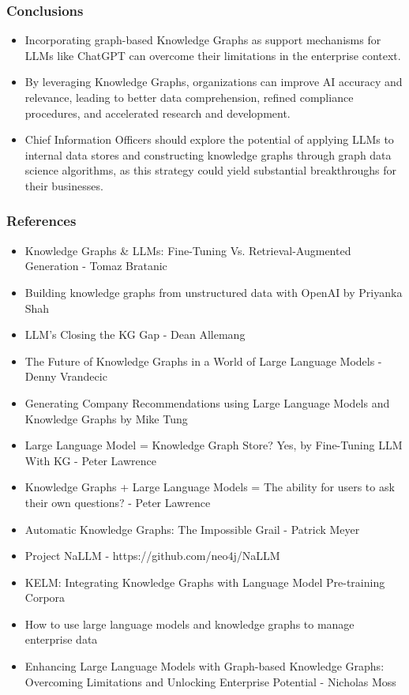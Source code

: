 \begin{frame}[fragile]\frametitle{Conclusions}
\begin{itemize}
\item Incorporating graph-based Knowledge Graphs as support mechanisms for LLMs like ChatGPT can overcome their limitations in the enterprise context. 
\item By leveraging Knowledge Graphs, organizations can improve AI accuracy and relevance, leading to better data comprehension, refined compliance procedures, and accelerated research and development. 
\item Chief Information Officers should explore the potential of applying LLMs to internal data stores and constructing knowledge graphs through graph data science algorithms, as this strategy could yield substantial breakthroughs for their businesses.
\end{itemize}
\end{frame}


\begin{frame}[fragile]\frametitle{References}
\begin{itemize}
\item Knowledge Graphs \& LLMs: Fine-Tuning Vs. Retrieval-Augmented Generation - Tomaz Bratanic
\item Building knowledge graphs from unstructured data with OpenAI by Priyanka Shah
\item LLM’s Closing the KG Gap - Dean Allemang
\item The Future of Knowledge Graphs in a World of Large Language Models - Denny Vrandecic
\item Generating Company Recommendations using Large Language Models and Knowledge Graphs by Mike Tung
\item Large Language Model = Knowledge Graph Store? Yes, by Fine-Tuning LLM With KG - Peter Lawrence
\item Knowledge Graphs + Large Language Models = The ability for users to ask their own questions? - Peter Lawrence
\item Automatic Knowledge Graphs: The Impossible Grail - Patrick Meyer
\item Project NaLLM - https://github.com/neo4j/NaLLM
\item KELM: Integrating Knowledge Graphs with Language Model Pre-training Corpora 
\item How to use large language models and knowledge graphs to manage enterprise data 
\item Enhancing Large Language Models with Graph-based Knowledge Graphs: Overcoming Limitations and Unlocking Enterprise Potential - Nicholas Moss
\end{itemize}
\end{frame}
